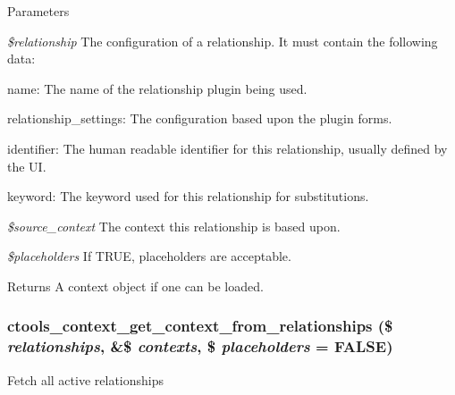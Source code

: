 \begin{DoxyParams}{Parameters}
\item[{\em \$relationship}]The configuration of a relationship. It must contain the following data:
\begin{DoxyItemize}
\item name: The name of the relationship plugin being used.
\item relationship\_\-settings: The configuration based upon the plugin forms.
\item identifier: The human readable identifier for this relationship, usually defined by the UI.
\item keyword: The keyword used for this relationship for substitutions.
\end{DoxyItemize}\item[{\em \$source\_\-context}]The context this relationship is based upon.\item[{\em \$placeholders}]If TRUE, placeholders are acceptable.\end{DoxyParams}
\begin{DoxyReturn}{Returns}
A context object if one can be loaded. 
\end{DoxyReturn}
\hypertarget{context_8inc_a4cc9c61941295be0a745aa42c6188d2f}{
\subsubsection[{ctools\_\-context\_\-get\_\-context\_\-from\_\-relationships}]{\setlength{\rightskip}{0pt plus 5cm}ctools\_\-context\_\-get\_\-context\_\-from\_\-relationships (\$ {\em relationships}, \/  \&\$ {\em contexts}, \/  \$ {\em placeholders} = {\ttfamily FALSE})}}
\label{context_8inc_a4cc9c61941295be0a745aa42c6188d2f}
Fetch all active relationships


